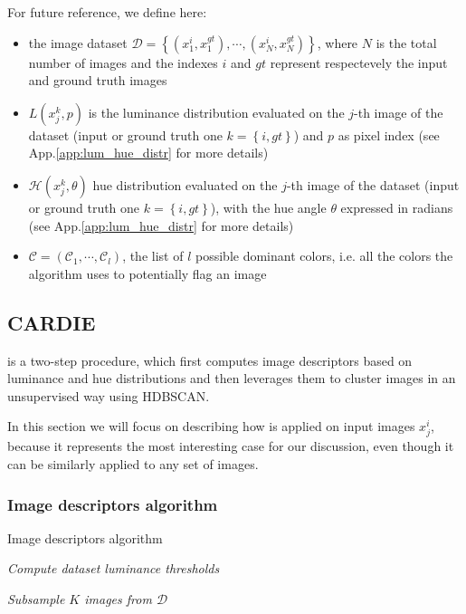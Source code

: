 \documentclass[12pt]{spieman}  %
\begin{document}
\begin{spacing}{2}
\begin{linenumbers}
For future reference, we define here:
\begin{itemize}
	\item the image dataset $\mathcal{D} = \left \{ \left (x^{i}_1, x^{gt}_1   \right ), \cdots, \left(x^{i}_N, x^{gt}_N \right)    \right \}$, where $ N$ is the total number of images and the indexes $i$ and $gt$ represent respectevely the input and ground truth images 
	\item $L(x^{k}_j, p)$ is the luminance distribution evaluated on the $j$-th image of the dataset (input or ground truth one  $k = \left \{ i, gt  \right \}$) and $p$ as pixel index (see App.\ref{app:lum_hue_distr} for more details)
	\item $\mathcal{H}(x^{k}_j, \theta)$  hue distribution evaluated on the $j$-th image of the dataset (input or ground truth one  $k = \left \{ i, gt  \right \}$), with the hue angle $\theta$ expressed in radians (see App.\ref{app:lum_hue_distr} for more details) 
	\item $\mathcal{C} = \left ( \mathcal{C}_1, \cdots, \mathcal{C}_l    \right )$, the list of $l$ possible dominant colors, i.e. all the colors the algorithm uses to potentially flag an image  
\end{itemize}  

\subsection{CARDIE}
\label{subsection:clustering_algo}

\clustname is a two-step procedure, which first computes image descriptors based on  luminance and hue distributions and then leverages them to cluster images in an unsupervised way using HDBSCAN. 


In this section we will focus on describing how \clustname is applied on input images $x^{i}_j$, because it represents the most interesting case for our discussion, even though  it can be similarly applied to any set of images. 


\subsubsection{Image descriptors algorithm}
\label{subsection:image_descriptor}


\begin{algorithm}
\caption{Image descriptors algorithm}

\textit{Compute dataset luminance thresholds}

\textit{Subsample $K$ images from $\mathcal{D}$}



\end{algorithm}
\end{linenumbers}
\end{spacing}
\end{document}
